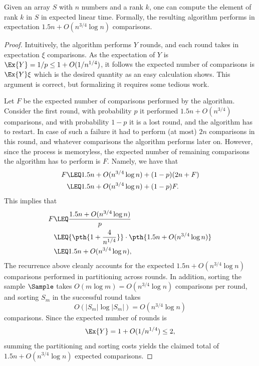 \begin{theorem}
    Given an array $S$ with $n$ numbers and a rank $k$, one can compute
    the element of rank $k$ in $S$ in expected linear time.
    Formally, the resulting algorithm performs in expectation
    $1.5 n + O( n^{3/4} \log n)$ comparisons.
\end{theorem}
\begin{proof}
    Intuitively, the algorithm performs $Y$ rounds, and each round takes
    in expectation $\xi$ comparisons. As the expectation of $Y$ is
    $\Ex{Y} = 1/p \leq 1 + O(1/n^{1/4})$, it follows the expected number of
    comparisons is $\Ex{Y} \xi$ which is the desired quantity as an easy
    calculation shows. This argument is correct, but formalizing it
    requires some tedious work.

    Let $F$ be the expected number of comparisons performed by the
    algorithm. Consider the first round, with probability $p$ it
    performed $1.5n + O(n^{3/4})$ comparisons, and with probability $1-p$
    it is a lost round, and the algorithm has to restart. In case of such
    a failure it had to perform (at most) $2n$ comparisons in this round,
    and whatever comparisons the algorithm performs later on. However,
    since the process is memoryless, the expected number of remaining
    comparisons the algorithm has to perform is $F$. Namely, we have that
    \begin{align*}
        F
        &\LEQ
        1.5n + O(n^{3/4} \log n) + (1-p)(2n + F)
        \\&%
        \LEQ%
        1.5n + O(n^{3/4} \log n) +(1-p) F.
    \end{align*}
    This implies that
    \begin{align*}
        F
        &\LEQ
        \frac{1.5 n + O(n^{3/4} \log n) }{p}
        \\&
        \LEQ
        {\pth{ 1 + \frac{4}{n^{1/4}}}}
        \cdot \pth{1.5 n + O(n^{3/4}\log n) }
        \\&%
        \LEQ%
        1.5n + O(n^{3/4} \log n),
    \end{align*}
    The recurrence above cleanly accounts for the expected
    $1.5n + O(n^{3/4} \log n)$ comparisons performed in partitioning across
     rounds. In addition, sorting the sample $\Sample$ takes
    $O(m \log m) = O(n^{3/4} \log n)$ comparisons per round, and sorting
    $S_m$ in the  successful round takes
    \begin{equation*}
        O(|S_m| \log |S_m|) = O(n^{3/4} \log n)
    \end{equation*}
    comparisons. Since the expected number of rounds is
    \[
        \Ex{Y} = 1 + O(1/n^{1/4}) \leq 2,
    \]
    summing the partitioning and sorting costs yields the claimed total
    of $1.5n + O(n^{3/4} \log n)$ expected comparisons.
\end{proof}

